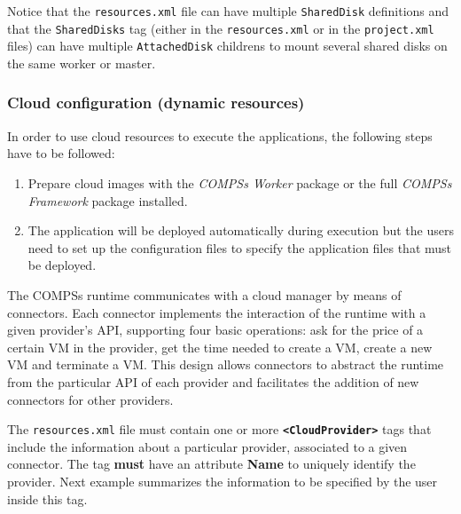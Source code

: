 Notice that the \texttt{resources.xml} file can have multiple \texttt{SharedDisk} definitions and that the \texttt{SharedDisks}
tag (either in the \texttt{resources.xml} or in the \texttt{project.xml} files) can have multiple \texttt{AttachedDisk} childrens
to mount several shared disks on the same worker or master. 

\subsubsection{Cloud configuration (dynamic resources)}
In order to use cloud resources to execute the applications, the following steps have to be followed:
\begin{enumerate}
 \item Prepare cloud images with the \textit{COMPSs Worker} package or the full \textit{COMPSs Framework} package installed.
 \item The application will be deployed automatically during execution but the users need to set up the configuration files to
 specify the application files that must be deployed. 
\end{enumerate}

The COMPSs runtime communicates with a cloud manager by means of connectors. Each connector implements 
the interaction of the runtime with a given provider's API, supporting four basic 
operations: ask for the price of a certain VM in the provider, get the time needed to create a VM, 
create a new VM and terminate a VM. This design allows connectors to abstract the runtime from the particular API
of each provider and facilitates the addition of new connectors for other providers.

The \texttt{resources.xml} file must contain one or more \textbf{\texttt{<CloudProvider>}} tags
that include the information about a particular provider, associated to a given connector. The tag \textbf{must} have an
attribute \textbf{Name} to uniquely identify the provider. Next example summarizes the information to be specified by the 
user inside this tag.

